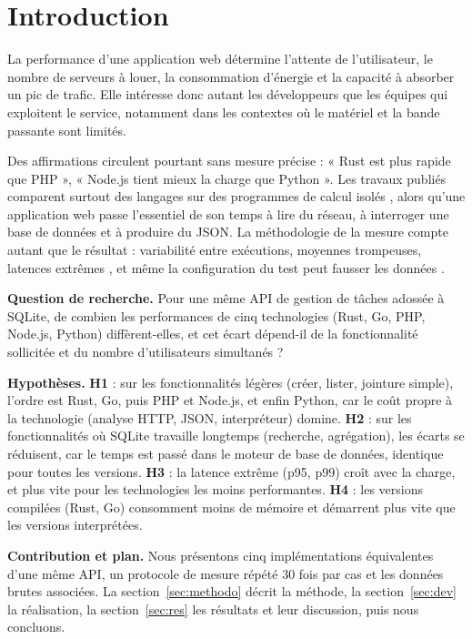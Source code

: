 \section{Introduction}
La performance d'une application web détermine l'attente de l'utilisateur, le nombre de serveurs à louer, la
consommation d'énergie et la capacité à absorber un pic de trafic. Elle intéresse donc autant les développeurs que
les équipes qui exploitent le service, notamment dans les contextes où le matériel et la bande passante sont
limités.

Des affirmations circulent pourtant sans mesure précise : « Rust est plus rapide que PHP », « Node.js tient mieux la
charge que Python ». Les travaux publiés comparent surtout des langages sur des programmes de calcul isolés
\cite{pereira2017}, alors qu'une application web passe l'essentiel de son temps à lire du réseau, à interroger une
base de données et à produire du JSON. La méthodologie de la mesure compte autant que le résultat : variabilité
entre exécutions, moyennes trompeuses, latences extrêmes \cite{georges2007,dean2013}, et même la configuration du
test peut fausser les données \cite{mytkowicz2009}.

\textbf{Question de recherche.} Pour une même API de gestion de tâches adossée à SQLite, de combien les
performances de cinq technologies (Rust, Go, PHP, Node.js, Python) diffèrent-elles, et cet écart dépend-il de la
fonctionnalité sollicitée et du nombre d'utilisateurs simultanés ?

\textbf{Hypothèses.}
\textbf{H1} : sur les fonctionnalités légères (créer, lister, jointure simple), l'ordre est Rust, Go, puis PHP et
Node.js, et enfin Python, car le coût propre à la technologie (analyse HTTP, JSON, interpréteur) domine.
\textbf{H2} : sur les fonctionnalités où SQLite travaille longtemps (recherche, agrégation), les écarts se réduisent,
car le temps est passé dans le moteur de base de données, identique pour toutes les versions.
\textbf{H3} : la latence extrême (p95, p99) croît avec la charge, et plus vite pour les technologies les moins
performantes.
\textbf{H4} : les versions compilées (Rust, Go) consomment moins de mémoire et démarrent plus vite que les versions
interprétées.

\textbf{Contribution et plan.} Nous présentons cinq implémentations équivalentes d'une même API, un protocole de
mesure répété 30 fois par cas et les données brutes associées. La section~\ref{sec:methodo} décrit la méthode, la
section~\ref{sec:dev} la réalisation, la section~\ref{sec:res} les résultats et leur discussion, puis nous
concluons.
